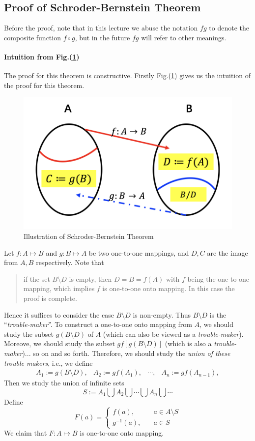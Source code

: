 \subsection{Proof of Schroder-Bernstein Theorem}
Before the proof, note that in this lecture we abuse the notation $fg$ to denote the composite function $f\circ g$, but in the future $fg$ will refer to other meanings.
\paragraph{Intuition from Fig.(\ref{Fig:1:2})}
The proof for this theorem is constructive. Firstly Fig.(\ref{Fig:1:2}) gives us the intuition of the proof for this theorem. 
\begin{figure}
\centering
\includegraphics[width=0.65\linewidth]{week1/f_5}
\caption{Illustration of Schroder-Bernstein Theorem}
\label{Fig:1:2}
\end{figure}
Let $f: A\mapsto B$ and $g: B\mapsto A$ be two one-to-one mappings, and $D,C$ are the image from $A,B$ respectively. Note that
\begin{quotation}
if the set $B\setminus D$ is empty, then $D=B=f(A)$ with $f$ being the one-to-one mapping, which implies $f$ is one-to-one onto mapping. In this case the proof is complete.
\end{quotation}
Hence it suffices to consider the case $B\setminus D$ is non-empty. Thus $B\setminus D$ is the ``\emph{trouble-maker}''. To construct a one-to-one onto mapping from $A$, we should study the subset $g(B\setminus D)$ of $A$ (which can also be viewed as a \textit{trouble-maker}). Moreove, we should study the subset $gf[g(B\setminus D)]$ (which is also a \textit{trouble-maker})... so on and so forth. Therefore, we should study the \textit{union of these trouble makers}, i.e., we define
\[
\begin{array}{llll}
A_1:=g(B\setminus D),
&
A_2:=gf(A_1),
&
\cdots,
&
A_{n}:=gf(A_{n-1}),
\end{array}
\]
Then we study the union of infinite sets
\[
S:=A_1\bigcup A_2\bigcup\cdots\bigcup A_n\bigcup\cdots
\]
Define
\[
F(a)=\left\{
\begin{aligned}
f(a),&\quad a\in A\setminus S\\
g^{-1}(a),&\quad a\in S
\end{aligned}
\right.
\]
We claim that $F:A\mapsto B$ is one-to-one onto mapping.
